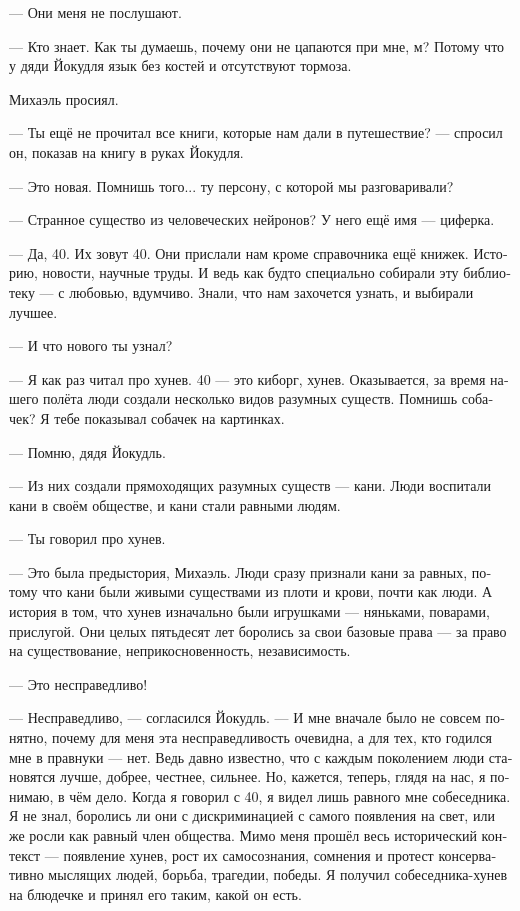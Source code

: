 \documentclass[a4paper,12pt,fleqn]{book}\usepackage{polyglossia}\setdefaultlanguage[babelshorthands=true]{russian}\setotherlanguage{english}\defaultfontfeatures{Ligatures=TeX,Mapping=tex-text}\usepackage{xcolor}\newcommand{\ml}[3]{#2}
\begin{document}
--- Они меня не послушают.

\ml{$0$}
{--- Кто знает.}
{``Who knows.}
\ml{$0$}
{Как ты думаешь, почему они не цапаются при мне, м?}
{Why do you think they don't bicker in front of me, hm?}
\ml{$0$}
{Потому что у дяди Йокудля язык без костей и отсутствуют тормоза.}
{'Cuz Unkle Jökull got a big mouth, and that mouth is out of control.''}

Михаэль просиял.

--- Ты ещё не прочитал все книги, которые нам дали в путешествие? --- спросил он, показав на книгу в руках Йокудля.

\ml{$0$}
{--- Это новая.}
{``It's a new one.}
Помнишь того... ту персону, с которой мы разговаривали?

--- Странное существо из человеческих нейронов?
У него ещё имя --- циферка.

--- Да, 40.
Их зовут 40.
Они прислали нам кроме справочника ещё книжек.
Историю, новости, научные труды.
И ведь как будто специально собирали эту библиотеку --- с любовью, вдумчиво.
Знали, что нам захочется узнать, и выбирали лучшее.

--- И что нового ты узнал?

--- Я как раз читал про хунев.
40 --- это киборг, хунев.
Оказывается, за время нашего полёта люди создали несколько видов разумных существ.
Помнишь собачек?
Я тебе показывал собачек на картинках.

--- Помню, дядя Йокудль.

--- Из них создали прямоходящих разумных существ --- кани.
Люди воспитали кани в своём обществе, и кани стали равными людям.

--- Ты говорил про хунев.

--- Это была предыстория, Михаэль.
Люди сразу признали кани за равных, потому что кани были живыми существами из плоти и крови, почти как люди.
А история в том, что хунев изначально были игрушками --- няньками, поварами, прислугой.
Они целых пятьдесят лет боролись за свои базовые права --- за право на существование, неприкосновенность, независимость.

--- Это несправедливо!

--- Несправедливо, --- согласился Йокудль.
--- И мне вначале было не совсем понятно, почему для меня эта несправедливость очевидна, а для тех, кто годился мне в правнуки --- нет.
Ведь давно известно, что с каждым поколением люди становятся лучше, добрее, честнее, сильнее.
Но, кажется, теперь, глядя на нас, я понимаю, в чём дело.
Когда я говорил с 40, я видел лишь равного мне собеседника.
Я не знал, боролись ли они с дискриминацией с самого появления на свет, или же росли как равный член общества.
Мимо меня прошёл весь исторический контекст --- появление хунев, рост их самосознания, сомнения и протест консервативно мыслящих людей, борьба, трагедии, победы.
Я получил собеседника-хунев на блюдечке и принял его таким, какой он есть.
\end{document}

